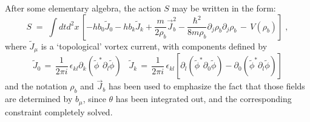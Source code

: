 \documentclass[a4paper,12pt]{article} \tolerance=200
\begin{document}
After some elementary algebra, the action $S$ may be written in the
form:
\begin{equation}\label{eq:sequiv2}
S\;=\; \int dt d^2x \, \left[ -h b_0 {\tilde J}_0 - h b_k {\tilde J}_k
+ \frac{m}{2 \rho_b} {\vec J}^2_b - \frac{\hbar^2}{8 m \rho_b}
\partial_j\rho_b \partial_j \rho_b \,-\, V(\rho_b) \right] \;,
\end{equation}
where ${\tilde J}_\mu$ is a `topological' vortex current, with
components defined by
\begin{equation}\label{eq:defjtop}
{\tilde J}_0 \,=\, \frac{1}{2\pi i} \, \epsilon_{kl} \partial_k
({\tilde \phi}^* \partial_l {\tilde \phi} ) \;\;\; {\tilde J}_k
\,=\,\frac{1}{2\pi i} \,\epsilon_{kl} [\partial_l ({\tilde \phi}^*
\partial_0 {\tilde \phi} ) - \partial_0 ({\tilde \phi}^* \partial_l
{\tilde \phi})]
\end{equation}
and the notation $\rho_b$ and ${\vec J}_b$ has been used to emphasize
the fact that those fields are determined by $b_\mu$, since $\theta$
has been integrated out, and the corresponding constraint completely
solved.
\end{document}
